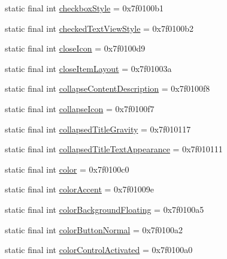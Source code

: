 \begin{CompactItemize}
static final int \hyperlink{classandroid_1_1support_1_1v7_1_1recyclerview_1_1_r_1_1attr_44fe190040ba1c1e21209ce2e72d5153}{checkboxStyle} = 0x7f0100b1
\item 
static final int \hyperlink{classandroid_1_1support_1_1v7_1_1recyclerview_1_1_r_1_1attr_eb907da274e1f14968160ded42673701}{checkedTextViewStyle} = 0x7f0100b2
\item 
static final int \hyperlink{classandroid_1_1support_1_1v7_1_1recyclerview_1_1_r_1_1attr_17b9db8ab6c738174e60ac34c9f05fde}{closeIcon} = 0x7f0100d9
\item 
static final int \hyperlink{classandroid_1_1support_1_1v7_1_1recyclerview_1_1_r_1_1attr_dd5dce652188aa8ebba671625aab04fa}{closeItemLayout} = 0x7f01003a
\item 
static final int \hyperlink{classandroid_1_1support_1_1v7_1_1recyclerview_1_1_r_1_1attr_fb62cb84e6bef1194b1343ca63aedb64}{collapseContentDescription} = 0x7f0100f8
\item 
static final int \hyperlink{classandroid_1_1support_1_1v7_1_1recyclerview_1_1_r_1_1attr_771db84ec9c1b3e1c2c4cfed749a0547}{collapseIcon} = 0x7f0100f7
\item 
static final int \hyperlink{classandroid_1_1support_1_1v7_1_1recyclerview_1_1_r_1_1attr_19d93a9a13a41b73bdc3c032ee00911f}{collapsedTitleGravity} = 0x7f010117
\item 
static final int \hyperlink{classandroid_1_1support_1_1v7_1_1recyclerview_1_1_r_1_1attr_d7c1187f24486d955392f24e12d79faf}{collapsedTitleTextAppearance} = 0x7f010111
\item 
static final int \hyperlink{classandroid_1_1support_1_1v7_1_1recyclerview_1_1_r_1_1attr_af271b987ea4db1fb8e4ec05ed7ef97e}{color} = 0x7f0100c0
\item 
static final int \hyperlink{classandroid_1_1support_1_1v7_1_1recyclerview_1_1_r_1_1attr_e6a873c9360191223531f681f1159d0f}{colorAccent} = 0x7f01009e
\item 
static final int \hyperlink{classandroid_1_1support_1_1v7_1_1recyclerview_1_1_r_1_1attr_221d59fb6d8e872d81d7a7f97aa8ef82}{colorBackgroundFloating} = 0x7f0100a5
\item 
static final int \hyperlink{classandroid_1_1support_1_1v7_1_1recyclerview_1_1_r_1_1attr_f01dfa431ad114bcdb4d80a0c35f84ed}{colorButtonNormal} = 0x7f0100a2
\item 
static final int \hyperlink{classandroid_1_1support_1_1v7_1_1recyclerview_1_1_r_1_1attr_1b5d56b9bee4f00b18eae449702e74b8}{colorControlActivated} = 0x7f0100a0
\item 

\end{CompactItemize}

